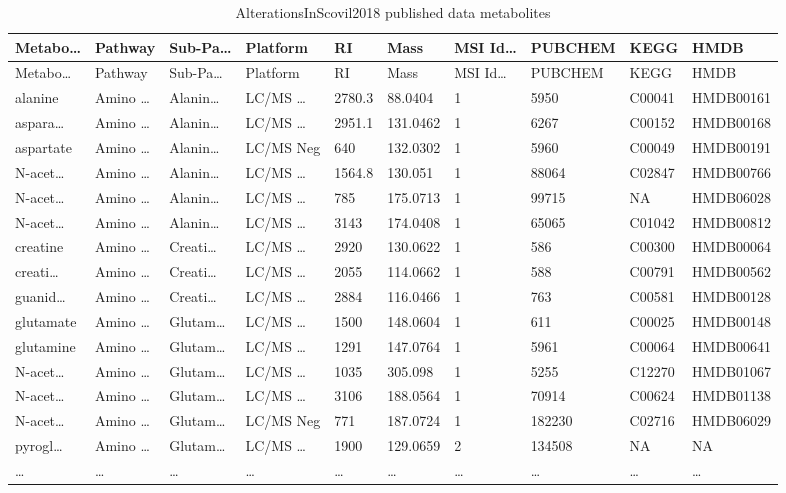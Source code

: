 \documentclass[
]{article}
\begin{document}
\begin{longtable}[]{@{}llllllllll@{}}
\caption{\label{tab:AlterationsInScovil2018-published-data-metabolites}AlterationsInScovil2018 published data metabolites}\tabularnewline
\toprule
Metabo\ldots{} & Pathway & Sub-Pa\ldots{} & Platform & RI & Mass & MSI Id\ldots{} & PUBCHEM & KEGG & HMDB\tabularnewline
\midrule
\endfirsthead
\toprule
Metabo\ldots{} & Pathway & Sub-Pa\ldots{} & Platform & RI & Mass & MSI Id\ldots{} & PUBCHEM & KEGG & HMDB\tabularnewline
\midrule
\endhead
alanine & Amino \ldots{} & Alanin\ldots{} & LC/MS \ldots{} & 2780.3 & 88.0404 & 1 & 5950 & C00041 & HMDB00161\tabularnewline
aspara\ldots{} & Amino \ldots{} & Alanin\ldots{} & LC/MS \ldots{} & 2951.1 & 131.0462 & 1 & 6267 & C00152 & HMDB00168\tabularnewline
aspartate & Amino \ldots{} & Alanin\ldots{} & LC/MS Neg & 640 & 132.0302 & 1 & 5960 & C00049 & HMDB00191\tabularnewline
N-acet\ldots{} & Amino \ldots{} & Alanin\ldots{} & LC/MS \ldots{} & 1564.8 & 130.051 & 1 & 88064 & C02847 & HMDB00766\tabularnewline
N-acet\ldots{} & Amino \ldots{} & Alanin\ldots{} & LC/MS \ldots{} & 785 & 175.0713 & 1 & 99715 & NA & HMDB06028\tabularnewline
N-acet\ldots{} & Amino \ldots{} & Alanin\ldots{} & LC/MS \ldots{} & 3143 & 174.0408 & 1 & 65065 & C01042 & HMDB00812\tabularnewline
creatine & Amino \ldots{} & Creati\ldots{} & LC/MS \ldots{} & 2920 & 130.0622 & 1 & 586 & C00300 & HMDB00064\tabularnewline
creati\ldots{} & Amino \ldots{} & Creati\ldots{} & LC/MS \ldots{} & 2055 & 114.0662 & 1 & 588 & C00791 & HMDB00562\tabularnewline
guanid\ldots{} & Amino \ldots{} & Creati\ldots{} & LC/MS \ldots{} & 2884 & 116.0466 & 1 & 763 & C00581 & HMDB00128\tabularnewline
glutamate & Amino \ldots{} & Glutam\ldots{} & LC/MS \ldots{} & 1500 & 148.0604 & 1 & 611 & C00025 & HMDB00148\tabularnewline
glutamine & Amino \ldots{} & Glutam\ldots{} & LC/MS \ldots{} & 1291 & 147.0764 & 1 & 5961 & C00064 & HMDB00641\tabularnewline
N-acet\ldots{} & Amino \ldots{} & Glutam\ldots{} & LC/MS \ldots{} & 1035 & 305.098 & 1 & 5255 & C12270 & HMDB01067\tabularnewline
N-acet\ldots{} & Amino \ldots{} & Glutam\ldots{} & LC/MS \ldots{} & 3106 & 188.0564 & 1 & 70914 & C00624 & HMDB01138\tabularnewline
N-acet\ldots{} & Amino \ldots{} & Glutam\ldots{} & LC/MS Neg & 771 & 187.0724 & 1 & 182230 & C02716 & HMDB06029\tabularnewline
pyrogl\ldots{} & Amino \ldots{} & Glutam\ldots{} & LC/MS \ldots{} & 1900 & 129.0659 & 2 & 134508 & NA & NA\tabularnewline
\ldots{} & \ldots{} & \ldots{} & \ldots{} & \ldots{} & \ldots{} & \ldots{} & \ldots{} & \ldots{} & \ldots{}\tabularnewline
\bottomrule
\end{longtable}
\end{document}
